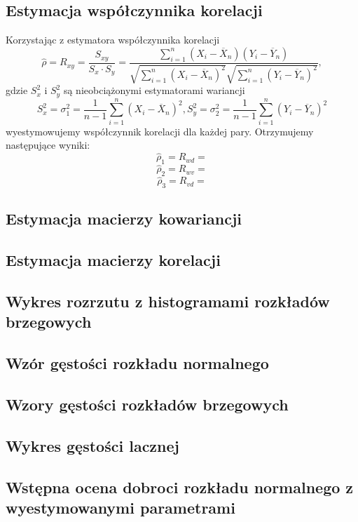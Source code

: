 \documentclass[a4paper,11pt]{article}
\begin{document}
\subsection{Estymacja współczynnika korelacji}
Korzystając z estymatora współczynnika korelacji
$$\hat{\rho}=R_{xy}=\frac{S_{xy}}{S_x\cdot S_y}=\frac{\sum_{i=1}^{n}(X_i-\overline{X}_n)(Y_i-\overline{Y}_n)}{\sqrt{\sum_{i=1}^{n}(X_i-\overline{X}_n)^{2}}\sqrt{\sum_{i=1}^{n}(Y_i-\overline{Y}_n)^{2}}},$$
gdzie $S_x^{2}$ i $S_y^{2}$ są nieobciążonymi estymatorami wariancji
$$S^2_x=\sigma_1^2=\frac{1}{n-1}\sum_{i=1}^{n}(X_i-\overline{X}_n)^2, S^2_y=\sigma_2^2=\frac{1}{n-1}\sum_{i=1}^{n}(Y_i-\overline{Y}_n)^2$$ 
wyestymowujemy współczynnik korelacji dla każdej pary. Otrzymujemy następujące wyniki:
$$\hat{\rho}_1=R_{wd}=$$
$$\hat{\rho}_2=R_{wv}=$$
$$\hat{\rho}_3=R_{vd}=$$


\subsection{Estymacja macierzy kowariancji}

\subsection{Estymacja macierzy korelacji}

\subsection{Wykres rozrzutu z histogramami rozkładów brzegowych}

\subsection{Wzór gęstości rozkładu normalnego}

\subsection{Wzory gęstości rozkładów brzegowych}

\subsection{Wykres gęstości lacznej}

\subsection{Wstępna ocena dobroci rozkładu normalnego z wyestymowanymi parametrami}
\end{document}
